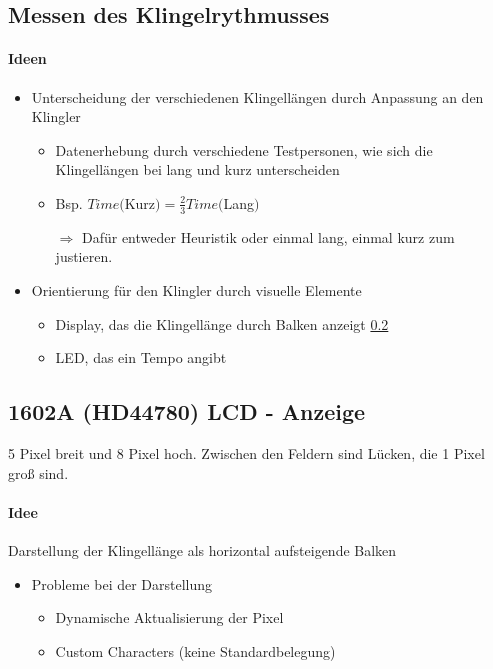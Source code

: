 \documentclass{scrartcl}
\begin{document}

\subsection{Messen des Klingelrythmusses}\label{ssec:mess}

\paragraph{Ideen}
\begin{itemize}
\item Unterscheidung der verschiedenen Klingellängen durch Anpassung an den Klingler
\begin{itemize}
\item Datenerhebung durch verschiedene Testpersonen, wie sich die Klingellängen bei lang und kurz unterscheiden
\item Bsp. $Time($Kurz$) = \frac{2}{3} Time($Lang$)$
\item[$\Rightarrow$] Dafür entweder Heuristik oder einmal lang, einmal kurz zum justieren.
\end{itemize}
\item Orientierung für den Klingler durch visuelle Elemente
\begin{itemize}
\item Display, das die Klingellänge durch Balken anzeigt \ref{ssec:lcd}
\item LED, das ein Tempo angibt
\end{itemize}
\end{itemize}



\subsection{1602A (HD44780) LCD - Anzeige}\label{ssec:lcd} 


5 Pixel breit und 8 Pixel hoch. Zwischen den Feldern sind Lücken, die 1 Pixel groß sind.
\paragraph{Idee} Darstellung der Klingellänge als horizontal aufsteigende Balken
\begin{itemize}
\item Probleme bei der Darstellung
\begin{itemize}
\item Dynamische Aktualisierung der Pixel
\item Custom Characters (keine Standardbelegung)
\end{itemize}
\end{itemize}
\end{document}
